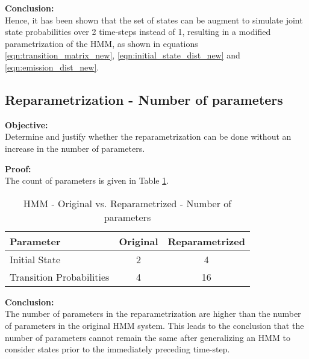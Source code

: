 \documentclass[parskip=half]{scrartcl}
\begin{document}
        \textbf{Conclusion:}\\
        Hence, it has been shown that the set of states can be augment to simulate joint state probabilities over 2 time-steps instead of 1, resulting in a modified parametrization of the HMM, as shown in equations \ref{eqn:transition_matrix_new}, \ref{eqn:initial_state_dist_new} and \ref{eqn:emission_dist_new}.
    


    \subsection{Reparametrization - Number of parameters} %
    \label{sub:reparametrization_number_of_parameters}

        \textbf{Objective:}\\
        Determine and justify whether the reparametrization can be done without an increase in the number of parameters.

        \textbf{Proof:}\\
        The count of parameters is given in Table \ref{tab:hmm-original-vs-reparametrized}.
        \begin{table}[th]
            \centering
            \begin{tabular}{| l | c | c |}
            \hline
            \textbf{Parameter} & \textbf{Original} & \textbf{Reparametrized} \\
            \hline
            \hline
                Initial State & 2 & 4 \\
            \hline
                Transition Probabilities & 4 & 16 \\
            \hline
            \end{tabular}
            \caption{HMM - Original vs. Reparametrized - Number of parameters}
            \label{tab:hmm-original-vs-reparametrized}
        \end{table}

        \textbf{Conclusion:}\\
        The number of parameters in the reparametrization are higher than the number of parameters in the original HMM system. This leads to the conclusion that the number of parameters cannot remain the same after generalizing an HMM to consider states prior to the immediately preceding time-step.
    
\end{document}
